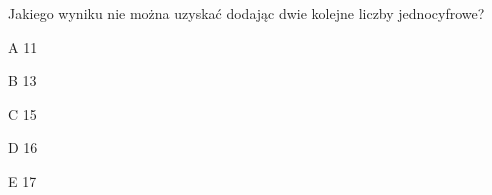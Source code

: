 \begin{tresc}
Jakiego wyniku nie można uzyskać dodając dwie kolejne liczby jednocyfrowe?
\end{tresc}
\begin{wariant}{A} 11 \end{wariant}
\begin{wariant}{B} 13 \end{wariant}
\begin{wariant}{C} 15 \end{wariant}
\begin{wariant}{D} 16 \end{wariant}
\begin{wariant}{E} 17 \end{wariant}
